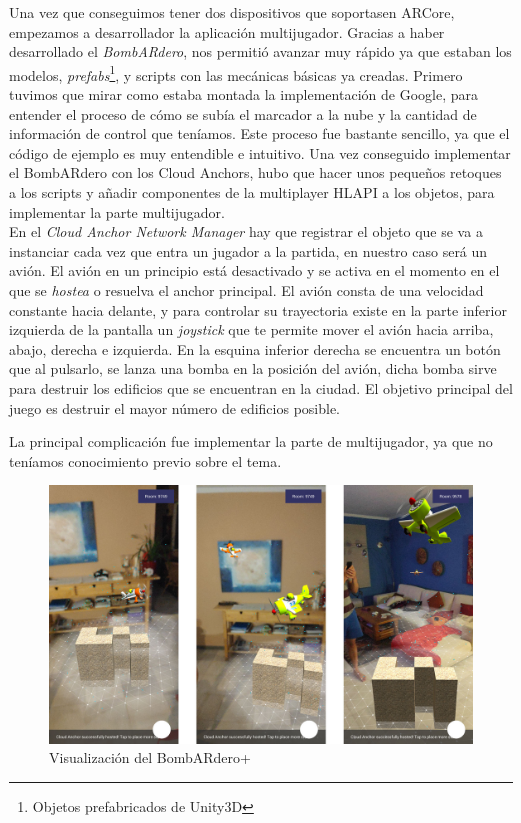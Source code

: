 Una vez que conseguimos tener dos dispositivos que soportasen ARCore, empezamos a desarrollador la aplicación multijugador. Gracias a haber desarrollado el \textit{BombARdero}, nos permitió avanzar muy rápido ya que estaban los modelos, \textit{prefabs}\footnote{ Objetos prefabricados de Unity3D}, y scripts con las mecánicas básicas ya creadas. Primero tuvimos que mirar como estaba montada la implementación de Google, para entender el proceso de cómo se subía el marcador a la nube y la cantidad de información de control que teníamos. Este proceso fue bastante sencillo, ya que el código de ejemplo es muy entendible e intuitivo. Una vez conseguido implementar el BombARdero con los Cloud Anchors, hubo que hacer unos pequeños retoques a los scripts y añadir componentes de la multiplayer HLAPI a los objetos, para implementar la parte multijugador.\\

En el \textit{Cloud Anchor Network Manager} hay que registrar el objeto que se va a instanciar cada vez que entra un jugador a la partida, en nuestro caso será un avión. El avión en un principio está desactivado y se activa en el momento en el que se \textit{hostea} o resuelva el anchor principal. El avión consta de una velocidad constante hacia delante, y para controlar su trayectoria existe en la parte inferior izquierda de la pantalla un \textit{joystick} que te permite mover el avión hacia arriba, abajo, derecha e izquierda. En la esquina inferior derecha se encuentra un botón que al pulsarlo, se lanza una bomba en la posición del avión, dicha bomba sirve para destruir los edificios que se encuentran en la ciudad. El objetivo principal del juego es destruir el mayor número de edificios posible.

La principal complicación fue implementar la parte de multijugador, ya que no teníamos conocimiento previo sobre el tema.
\begin{figure}[H]
    \centering
    \includegraphics[width=\linewidth]{Images/Bombardero.jpg}
    \caption{Visualización del BombARdero+}
    \label{Bombardero}
\end{figure}

